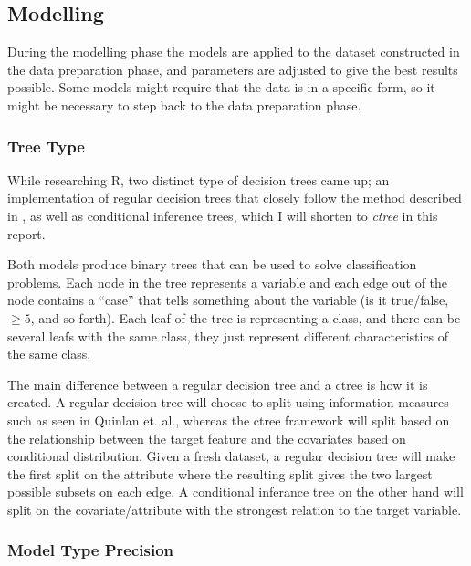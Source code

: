 \subsection{Modelling}

During the modelling phase the models are applied to the dataset constructed in
the data preparation phase, and parameters are adjusted to give the best results
possible. Some models might require that the data is in a specific form, so it
might be necessary to step back to the data preparation phase.

\subsubsection{Tree Type}

While researching R, two distinct type of decision trees came up; an
implementation of regular decision trees that closely follow the method
described in \cite{breiman1984classification}, as well as conditional inference
trees\cite{hothorn2006unbiased}, which I will shorten to \textit{ctree} in this
report.

Both models produce binary trees that can be used to solve classification
problems. Each node in the tree represents a variable and each edge out of the
node contains a ``case'' that tells something about the variable (is it
true/false, $\geq 5$, and so forth). Each leaf of the tree is representing a
class, and there can be several leafs with the same class, they just represent
different characteristics of the same class.

The main difference between a regular decision tree and a ctree is how it is
created. A regular decision tree will choose to split using information measures
such as seen in Quinlan et. al.\cite[p. 89]{quinlan1986induction}, whereas the
ctree framework will split based on the relationship between the target feature
and the covariates based on conditional distribution. Given a fresh dataset, a
regular decision tree will make the first split on the attribute where the
resulting split gives the two largest possible subsets on each edge. A
conditional inferance tree on the other hand will split on the
covariate/attribute with the strongest relation to the target variable.


\subsubsection{Model Type Precision}
\label{sec:treetypeprecision}

